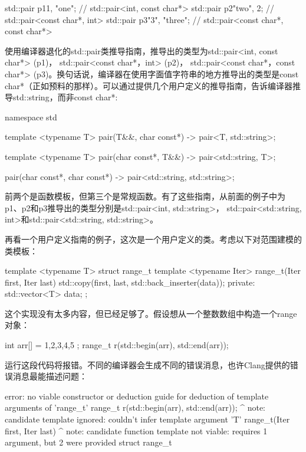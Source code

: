 \begin{cpp}
std::pair p1{1, "one"}; // std::pair<int, const char*>
std::pair p2{"two", 2}; // std::pair<const char*, int>
std::pair p3{"3", "three"};
// std::pair<const char*, const char*>
\end{cpp}

使用编译器退化的std::pair类推导指南，推导出的类型为std::pair<int, const char*> (p1)， std::pair<const char*，int> (p2)， std::pair<const char*，const char*> (p3)。换句话说，编译器在使用字面值字符串的地方推导出的类型是const char*（正如预料的那样）。可以通过提供几个用户定义的推导指南，告诉编译器推导std::string，而非const char*:

\begin{cpp}
namespace std
{
	template <typename T>
	pair(T&&, char const*) -> pair<T, std::string>;
	
	template <typename T>
	pair(char const*, T&&) -> pair<std::string, T>;
	
	pair(char const*, char const*) ->
	pair<std::string, std::string>;
}
\end{cpp}

前两个是函数模板，但第三个是常规函数。有了这些指南，从前面的例子中为p1、p2和p3推导出的类型分别是std::pair<int, std::string>， std::pair<std::string, int>和std::pair<std::string, std::string>。

再看一个用户定义指南的例子，这次是一个用户定义的类。考虑以下对范围建模的类模板：

\begin{cpp}
template <typename T>
struct range_t
{
	template <typename Iter>
	range_t(Iter first, Iter last)
	{
		std::copy(first, last, std::back_inserter(data));
	}
	private:
	std::vector<T> data;
};
\end{cpp}

这个实现没有太多内容，但已经足够了。假设想从一个整数数组中构造一个range对象：

\begin{cpp}
int arr[] = { 1,2,3,4,5 };
range_t r(std::begin(arr), std::end(arr));
\end{cpp}

运行这段代码将报错。不同的编译器会生成不同的错误消息，也许Clang提供的错误消息最能描述问题：

\begin{shell}
error: no viable constructor or deduction guide for deduction
of template arguments of 'range_t'
range_t r(std::begin(arr), std::end(arr));
         ^
note: candidate template ignored: couldn't infer template
argument 'T'
range_t(Iter first, Iter last)
         ^
note: candidate function template not viable: requires 1
argument, but 2 were provided
struct range_t
\end{shell}


